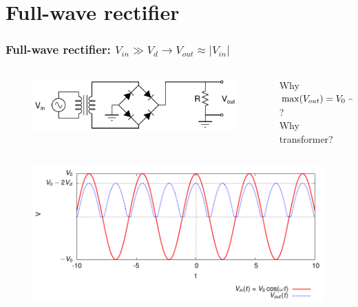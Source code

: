 \documentclass[beamer]{standalone}
\begin{document}
\section{Full-wave rectifier}
\begin{frame}
 \frametitle{Full-wave rectifier: $V_{in} \gg V_d \to V_{out} \approx | V_{in}|$}
  \begin{columns}[c]
    \begin{column}{.50\textwidth}
  \begin{figure}
    \includegraphics[width=0.90\columnwidth]{./schematics/full_wave_rectifier}
  \end{figure}
    \end{column}
    \begin{column}{.50\textwidth}
      Why $\max(V_{out}) = V_0 - \alert{2 V_d} $ ? \\
      Why transformer?
    \end{column}
  \end{columns}
    \begin{figure}
      \includegraphics[angle=0,width=1.00\columnwidth]{./plots/full_wave_rectifier}
    \end{figure}
\end{frame}
  
\end{document}
